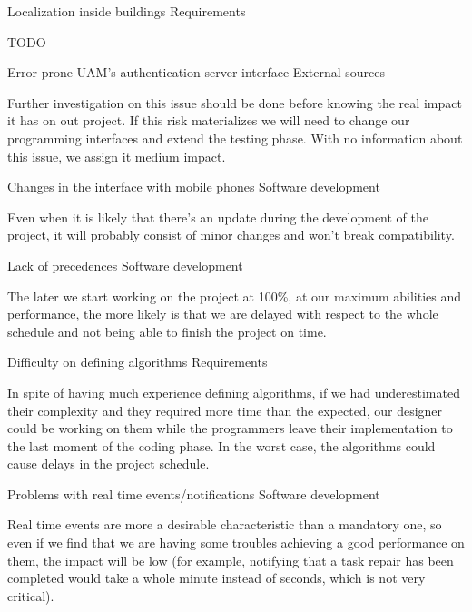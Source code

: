 \begin{risk}{Localization inside buildings}
\riskcat Requirements

TODO
\end{risk}

\begin{risk}{Error-prone UAM's authentication server interface}
\riskcat External sources

Further investigation on this issue should be done before knowing the real impact it has on out project. If this risk materializes we will need to change our programming interfaces and extend the testing phase. With no information about this issue, we assign it medium impact.
\end{risk}

\begin{risk}{Changes in the interface with mobile phones}
\riskcat Software development

Even when it is likely that there's an update during the development of the project, it will probably consist of minor changes and won't break compatibility.
\end{risk}

\begin{risk}{Lack of precedences}
\riskcat Software development

The later we start working on the project at 100\%, at our maximum abilities and performance, the more likely is that we are delayed with respect to the whole schedule and not being able to finish the project on time.
\end{risk}

\begin{risk}{Difficulty on defining algorithms}
\riskcat Requirements

In spite of having much experience defining algorithms, if we had underestimated their complexity and they required more time than the expected, our designer could be working on them while the programmers leave their implementation to the last moment of the coding phase. In the worst case, the algorithms could cause delays in the project schedule.
\end{risk}

\begin{risk}{Problems with real time events/notifications}
\riskcat Software development

Real time events are more a desirable characteristic than a mandatory one, so even if we find that we are having some troubles achieving a good performance on them, the impact will be low (for example, notifying that a task repair has been completed would take a whole minute instead of seconds, which is not very critical).
\end{risk}

